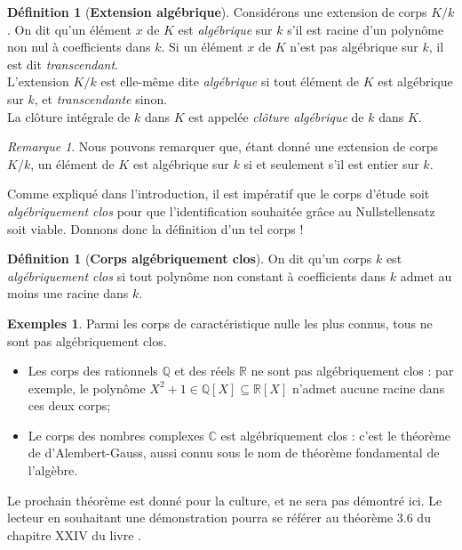 \documentclass[10pt, twoside]{article}
\theoremstyle{plain}
\theoremstyle{definition}
\newtheorem{definition}[theorem]{Définition}
\theoremstyle{plain}
\theoremstyle{plain}
\theoremstyle{definition}
\newtheorem*{example}{Exemples}
\theoremstyle{remark}
\newtheorem*{remark}{Remarque}
\begin{document}
\begin{definition}[\textbf{Extension algébrique}]\label{def:ext alg}
    Considérons une extension de corps $K/k$. On dit qu'un élément $x$ de $K$ est \textit{algébrique} sur $k$ s'il est racine d'un polynôme non nul à coefficients dans $k$. Si un élément $x$ de $K$ n'est pas algébrique sur $k$, il est dit \textit{transcendant}.\\
    L'extension $K/k$ est elle-même dite \textit{algébrique} si tout élément de $K$ est algébrique sur $k$, et \textit{transcendante} sinon.\\
    La clôture intégrale de $k$ dans $K$ est appelée \textit{clôture algébrique} de $k$ dans $K$.
\end{definition}

\begin{remark}
    Nous pouvons remarquer que, étant donné une extension de corps $K/k$, un élément de $K$ est algébrique sur $k$ si et seulement s'il est entier sur $k$.
\end{remark}

Comme expliqué dans l'introduction, il est impératif que le corps d'étude soit \textit{algébriquement clos} pour que l'identification souhaitée grâce au Nullstellensatz soit viable. Donnons donc la définition d'un tel corps !

\begin{definition}[\textbf{Corps algébriquement clos}]\label{def:corps clos}
    On dit qu'un corps $k$ est \textit{algébriquement clos} si tout polynôme non constant à coefficients dans $k$ admet au moins une racine dans $k$.
\end{definition}

\begin{example} Parmi les corps de caractéristique nulle les plus connus, tous ne sont pas algébriquement clos.
    \begin{itemize}
        \item Les corps des rationnels $\mathbb{Q}$ et des réels $\mathbb{R}$ ne sont pas algébriquement clos : par exemple, le polynôme $X^2 +1 \in \mathbb{Q}[X] \subseteq \mathbb{R}[X]$ n'admet aucune racine dans ces deux corps;
        \item Le corps des nombres complexes $\mathbb{C}$ est algébriquement clos : c'est le théorème de d'Alembert-Gauss, aussi connu sous le nom de théorème fondamental de l'algèbre.
    \end{itemize} 
\end{example}

Le prochain théorème est donné pour la culture, et ne sera pas démontré ici. Le lecteur en souhaitant une démonstration pourra se référer au théorème 3.6 du chapitre XXIV du livre \cite{Berhuy}.
\end{document}
